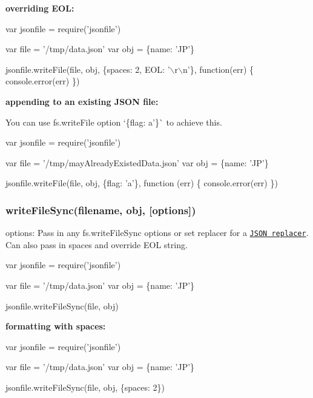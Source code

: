 {\bfseries overriding E\+OL\+:}


\begin{DoxyCode}
var jsonfile = require('jsonfile')

var file = '/tmp/data.json'
var obj = \{name: 'JP'\}

jsonfile.writeFile(file, obj, \{spaces: 2, EOL: '\(\backslash\)r\(\backslash\)n'\}, function(err) \{
  console.error(err)
\})
\end{DoxyCode}


{\bfseries appending to an existing J\+S\+ON file\+:}

You can use {\ttfamily fs.\+write\+File} option `\{flag\+: \textquotesingle{}a'\}\`{} to achieve this.


\begin{DoxyCode}
var jsonfile = require('jsonfile')

var file = '/tmp/mayAlreadyExistedData.json'
var obj = \{name: 'JP'\}

jsonfile.writeFile(file, obj, \{flag: 'a'\}, function (err) \{
  console.error(err)
\})
\end{DoxyCode}


\subsubsection*{write\+File\+Sync(filename, obj, \mbox{[}options\mbox{]})}

{\ttfamily options}\+: Pass in any {\ttfamily fs.\+write\+File\+Sync} options or set {\ttfamily replacer} for a \href{https://developer.mozilla.org/en-US/docs/Web/JavaScript/Reference/Global_Objects/JSON/stringify}{\tt J\+S\+ON replacer}. Can also pass in {\ttfamily spaces} and override {\ttfamily E\+OL} string.


\begin{DoxyCode}
var jsonfile = require('jsonfile')

var file = '/tmp/data.json'
var obj = \{name: 'JP'\}

jsonfile.writeFileSync(file, obj)
\end{DoxyCode}


{\bfseries formatting with spaces\+:}


\begin{DoxyCode}
var jsonfile = require('jsonfile')

var file = '/tmp/data.json'
var obj = \{name: 'JP'\}

jsonfile.writeFileSync(file, obj, \{spaces: 2\})
\end{DoxyCode}


